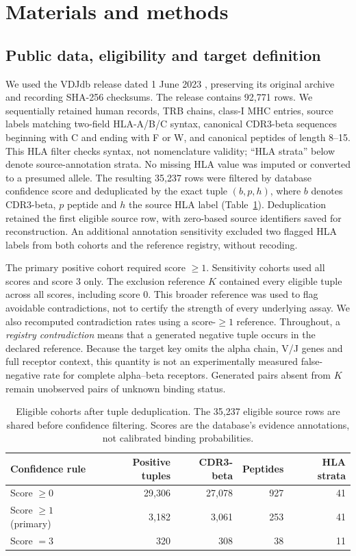 \documentclass[pdflatex,sn-basic,Numbered]{sn-jnl}
\begin{document}
\section{Materials and methods}\label{sec:methods}
\subsection{Public data, eligibility and target definition}
We used the VDJdb release dated 1 June 2023 \cite{Shugay2018}, preserving its original archive and recording SHA-256 checksums. The release contains 92,771 rows. We sequentially retained human records, TRB chains, class-I MHC entries, source labels matching two-field HLA-A/B/C syntax, canonical CDR3-beta sequences beginning with C and ending with F or W, and canonical peptides of length 8--15. This HLA filter checks syntax, not nomenclature validity; ``HLA strata'' below denote source-annotation strata. No missing HLA value was imputed or converted to a presumed allele. The resulting 35,237 rows were filtered by database confidence score and deduplicated by the exact tuple $(b,p,h)$, where $b$ denotes CDR3-beta, $p$ peptide and $h$ the source HLA label (Table~\ref{tab:cohort}). Deduplication retained the first eligible source row, with zero-based source identifiers saved for reconstruction. An additional annotation sensitivity excluded two flagged HLA labels from both cohorts and the reference registry, without recoding.

The primary positive cohort required score $\geq1$. Sensitivity cohorts used all scores and score 3 only. The exclusion reference $K$ contained every eligible tuple across all scores, including score 0. This broader reference was used to flag avoidable contradictions, not to certify the strength of every underlying assay. We also recomputed contradiction rates using a score-$\geq1$ reference. Throughout, a \emph{registry contradiction} means that a generated negative tuple occurs in the declared reference. Because the target key omits the alpha chain, V/J genes and full receptor context, this quantity is not an experimentally measured false-negative rate for complete alpha--beta receptors. Generated pairs absent from $K$ remain unobserved pairs of unknown binding status.

\begin{table}[t]
\caption{Eligible cohorts after tuple deduplication. The 35,237 eligible source rows are shared before confidence filtering. Scores are the database's evidence annotations, not calibrated binding probabilities.}\label{tab:cohort}
\centering
\begin{tabular}{lrrrr}
\toprule
Confidence rule & Positive tuples & CDR3-beta & Peptides & HLA strata\\
\midrule
Score $\geq0$ & 29,306 & 27,078 & 927 & 41\\
Score $\geq1$ (primary) & 3,182 & 3,061 & 253 & 41\\
Score $=3$ & 320 & 308 & 38 & 11\\
\bottomrule
\end{tabular}
\end{table}
\end{document}

